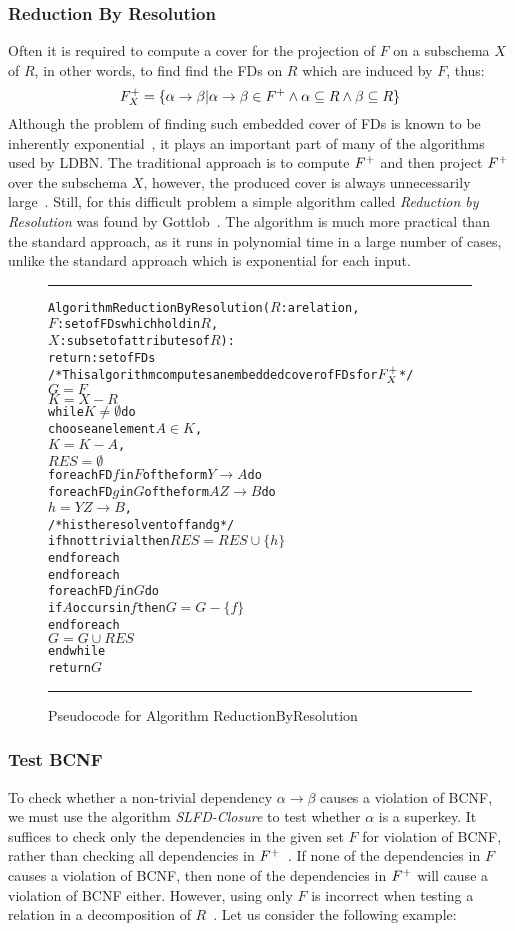 \subsubsection{Reduction By Resolution}
Often it is required to compute a cover for the projection of $F$ on a subschema $X$ of $R$, in 
other words, to find find the FDs on $R$ which are induced by $F$, thus:
\[ 
  F\sb{X}\sp{+} = \{\alpha\rightarrow\beta | \alpha \rightarrow \beta \in F\sp{+} \wedge \alpha \subseteq R \wedge \beta \subseteq R\}
\]
Although the problem of
finding such embedded cover of FDs is
known to be inherently exponential~\cite{p11}, it plays an important part of many of the algorithms
used by LDBN. The traditional approach is to compute $F\sp{+}$ and then project $F\sp{+}$ over the subschema $X$,
however, the produced cover
is always unnecessarily large~\cite{p4}. Still, for this difficult problem a simple 
algorithm called \textit{Reduction by Resolution}
was found by Gottlob~\cite{p4}. The algorithm is much more practical than the standard approach,
as it runs in polynomial time in a large number of cases, unlike the standard approach
which is exponential for each input. 

\begin{figure}[htbp]
\hrule
\vspace{0.25cm}
\begin{alltt}
Algorithm ReductionByResolution(\(R\): a relation,
                  \(F\) : set of FDs which hold in \(R\),
                  \(X\) : subset of attributes of \(R\)):
             return: set of FDs
/* This algorithm computes an embedded cover of FDs for \(F\sb{X}\sp{+}\) */
  \(G = F\)
  \(K = X - R\)
  while \(K \neq \emptyset\) do
    choose an element \(A \in K\),
    \(K = K - A\),
    \(RES = \emptyset\)
    foreach FD \(f\) in \(F\) of the form \(Y \rightarrow A\) do
      foreach FD \(g\) in \(G\) of the form \(AZ \rightarrow B\) do
        \(h = YZ \rightarrow B\),
        /* h is the resolvent of f and g */
        if h not trivial then \(RES = RES \cup \{h\}\)
      end foreach
    end foreach
    foreach FD \(f\) in \(G\) do
      if \(A\) occurs in \(f\) then \(G = G - \{f\}\)
    end foreach
    \(G = G \cup RES\)
  end while
  return \(G\)
\end{alltt}
\caption{Pseudocode for Algorithm ReductionByResolution}\label{alg:rbr}
\hrule
\end{figure}

\subsubsection{Test BCNF}
To check whether a non-trivial dependency $\alpha \rightarrow \beta$  causes a violation of BCNF,
we must use the algorithm \textit{SLFD-Closure} to test whether $\alpha$ is a superkey. 
It suffices to check only the dependencies in the given set $F$ for violation of BCNF, 
rather than checking all dependencies in $F\sp{+}$~\cite{bdb4}.  
If none of the dependencies in $F$ causes a violation of BCNF, 
then none of the dependencies in $F\sp{+}$ will cause a violation of BCNF either.
However, using only $F$ is incorrect when testing a relation in a decomposition of $R$~\cite{bdb4}.
Let us consider the following example:

